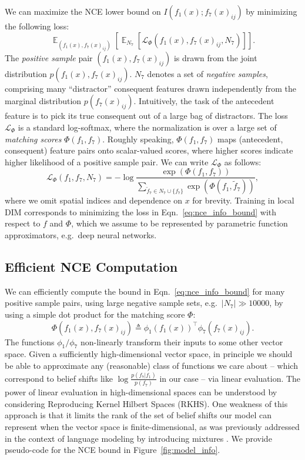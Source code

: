 \documentclass{article}
\newcommand{\LL}{\mathcal{L}}
\newcommand{\eqdef}{\triangleq}
\DeclareMathOperator*{\expect}{\mathbb{E}}
\begin{document}
We can maximize the NCE lower bound on $I(f_1(x); f_7(x)_{ij})$ by minimizing the following loss:
\begin{equation}
\expect_{(f_1(x), f_7(x)_{ij})} \left[ \expect_{N_7} \left[ \LL_{\Phi}(f_1(x), f_7(x)_{ij}, N_7) \right] \right].
\label{eq:nce_info_bound}
\end{equation}
The \emph{positive sample} pair $(f_1(x), f_7(x)_{ij})$ is drawn from the joint distribution $p(f_1(x), f_7(x)_{ij})$. $N_7$ denotes a set of \emph{negative samples}, comprising many ``distractor'' consequent features drawn independently from the marginal distribution $p(f_7(x)_{ij})$. Intuitively, the task of the antecedent feature is to pick its true consequent out of a large bag of distractors. The loss $\LL_{\Phi}$ is a standard log-softmax, where the normalization is over a large set of \emph{matching scores} $\Phi(f_1, f_7)$. Roughly speaking, $\Phi(f_1, f_7)$ maps (antecedent, consequent) feature pairs onto scalar-valued scores, where higher scores indicate higher likelihood of a positive sample pair. We can write $\LL_{\Phi}$ as follows:
\begin{equation}
\LL_{\Phi}(f_1, f_7, N_7) = - \log \frac{ \exp(\Phi(f_1, f_7))}{\sum_{\tilde{f}_7 \in N_7 \cup \{f_7\}} \exp(\Phi(f_1, \tilde{f}_7))},
\label{eq:nce_log_softmax}
\end{equation}
where we omit spatial indices and dependence on $x$ for brevity. Training in local DIM corresponds to minimizing the loss in Eqn.~\ref{eq:nce_info_bound} with respect to $f$ and $\Phi$, which we assume to be represented by parametric function approximators, e.g.~deep neural networks.



\subsection{Efficient NCE Computation}
We can efficiently compute the bound in Eqn.~\ref{eq:nce_info_bound} for many positive sample pairs, using large negative sample sets, e.g.~$|N_7| \gg 10000$, by using a simple dot product for the matching score $\Phi$:
\begin{equation}
\Phi(f_1(x), f_7(x)_{ij}) \eqdef \phi_1(f_1(x))^{\top} \phi_7(f_7(x)_{ij}).
\end{equation}
The functions $\phi_1/\phi_7$ non-linearly transform their inputs to some other vector space.
Given a sufficiently high-dimensional vector space, in principle we should be able to approximate any (reasonable) class of functions we care about -- which correspond to belief shifts like $\log \frac{p(f_7 | f_1)}{p(f_7)}$ in our case -- via linear evaluation.
The power of linear evaluation in high-dimensional spaces can be understood by considering Reproducing Kernel Hilbert Spaces (RKHS).
One weakness of this approach is that it limits the rank of the set of belief shifts our model can represent when the vector space is finite-dimensional, as was previously addressed in the context of language modeling by introducing mixtures \citep{Yang2018}.
We provide pseudo-code for the NCE bound in Figure~\ref{fig:model_info}.
\end{document}
